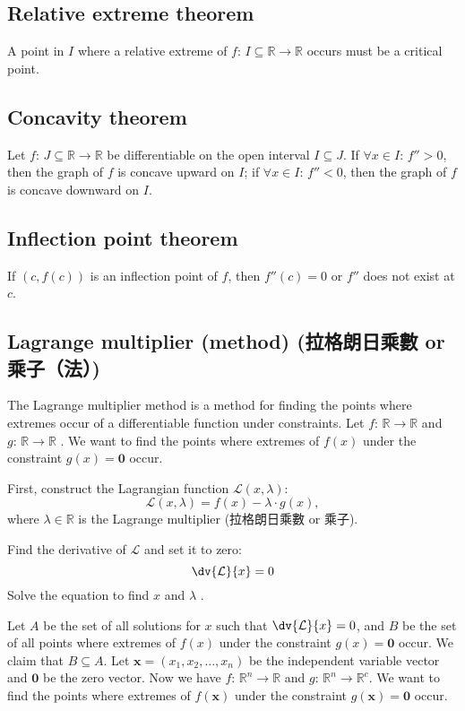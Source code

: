 \documentclass[a4paper,12pt]{report}
\begin{document}
{{{{{{{{{{{{\subsection{Relative extreme theorem}
A point in $I$ where a relative extreme of $f:\,I\subseteq\mathbb{R}\to\mathbb{R}$ occurs must be a critical point.
\subsection{Concavity theorem}
Let $f:\,J\subseteq\mathbb{R}\to\mathbb{R}$ be differentiable on the open interval $I\subseteq J$. If $\forall x\in I:\,f''>0$, then the graph of $f$ is concave upward on $I$; if $\forall x\in I:\,f''<0$, then the graph of $f$ is concave downward on $I$.
\subsection{Inflection point theorem}
If $(c,f(c))$ is an inflection point of $f$, then $f''(c)=0$ or $f''$ does not exist at $c$.
\subsection{Lagrange multiplier (method) (拉格朗日乘數 or 乘子（法）)}
The Lagrange multiplier method is a method for finding the points where extremes occur of a differentiable function under constraints.
Let $f:\,\mathbb{R} \rightarrow \mathbb{R}$ and $g:\,\mathbb{R} \rightarrow \mathbb{R}$ . We want to find the points where extremes of \( f(x) \) under the constraint \( g(x) = \mathbf{0} \) occur. 

First, construct the Lagrangian function \( \mathcal{L}(x,\lambda) \):
\[\mathcal{L}(x,\lambda) = f(x) - \lambda \cdot g(x),\]
where \( \lambda\in\mathbb{R} \) is the Lagrange multiplier (拉格朗日乘數 or 乘子).

Find the derivative of $\mathcal{L}$ and set it to zero:
\[
\dv{\mathcal{L}}{x} = 0
\]
Solve the equation to find \( x \) and \( \lambda \) . 

 Let $A$ be the set of all solutions for \( x \) such that $\dv{\mathcal{L}}{x} = 0$, and $B$ be the set of all points where extremes of \( f(x) \) under the constraint \( g(x) = \mathbf{0} \) occur. We claim that $B\subseteq A$.
Let \( \mathbf{x} = (x_1, x_2, \dots, x_n) \) be the independent variable vector and $\mathbf{0}$ be the zero vector. Now we have $f:\,\mathbb{R}^n \rightarrow \mathbb{R}$ and $g:\,\mathbb{R}^n \rightarrow \mathbb{R}^c$. We want to find the points where extremes of \( f(\mathbf{x}) \) under the constraint \( g(\mathbf{x}) = \mathbf{0}\) occur. 

}}}}}}}}}}}}
\end{document}
